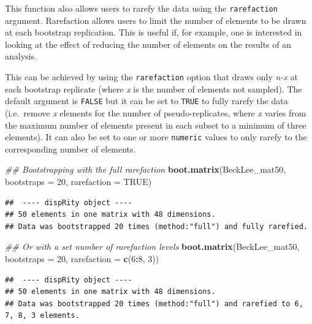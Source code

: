 \documentclass[]{book}
\newenvironment{Shaded}{\begin{snugshade}}{\end{snugshade}}
\newcommand{\CommentTok}[1]{\textcolor[rgb]{0.56,0.35,0.01}{\textit{#1}}}
\newcommand{\DataTypeTok}[1]{\textcolor[rgb]{0.13,0.29,0.53}{#1}}
\newcommand{\DecValTok}[1]{\textcolor[rgb]{0.00,0.00,0.81}{#1}}
\newcommand{\KeywordTok}[1]{\textcolor[rgb]{0.13,0.29,0.53}{\textbf{#1}}}
\newcommand{\NormalTok}[1]{#1}
\newcommand{\OperatorTok}[1]{\textcolor[rgb]{0.81,0.36,0.00}{\textbf{#1}}}
\newcommand{\OtherTok}[1]{\textcolor[rgb]{0.56,0.35,0.01}{#1}}
\begin{document}
This function also allows users to rarefy the data using the \texttt{rarefaction} argument.
Rarefaction allows users to limit the number of elements to be drawn at each bootstrap replication.
This is useful if, for example, one is interested in looking at the effect of reducing the number of elements on the results of an analysis.

This can be achieved by using the \texttt{rarefaction} option that draws only \emph{n-x} at each bootstrap replicate (where \emph{x} is the number of elements not sampled).
The default argument is \texttt{FALSE} but it can be set to \texttt{TRUE} to fully rarefy the data (i.e.~remove \emph{x} elements for the number of pseudo-replicates, where \emph{x} varies from the maximum number of elements present in each subset to a minimum of three elements).
It can also be set to one or more \texttt{numeric} values to only rarefy to the corresponding number of elements.

\begin{Shaded}
\begin{Highlighting}[]
\CommentTok{## Bootstrapping with the full rarefaction}
\KeywordTok{boot.matrix}\NormalTok{(BeckLee_mat50, }\DataTypeTok{bootstraps =} \DecValTok{20}\NormalTok{,}
            \DataTypeTok{rarefaction =} \OtherTok{TRUE}\NormalTok{)}
\end{Highlighting}
\end{Shaded}

\begin{verbatim}
##  ---- dispRity object ---- 
## 50 elements in one matrix with 48 dimensions.
## Data was bootstrapped 20 times (method:"full") and fully rarefied.
\end{verbatim}

\begin{Shaded}
\begin{Highlighting}[]
\CommentTok{## Or with a set number of rarefaction levels}
\KeywordTok{boot.matrix}\NormalTok{(BeckLee_mat50, }\DataTypeTok{bootstraps =} \DecValTok{20}\NormalTok{,}
            \DataTypeTok{rarefaction =} \KeywordTok{c}\NormalTok{(}\DecValTok{6}\OperatorTok{:}\DecValTok{8}\NormalTok{, }\DecValTok{3}\NormalTok{))}
\end{Highlighting}
\end{Shaded}

\begin{verbatim}
##  ---- dispRity object ---- 
## 50 elements in one matrix with 48 dimensions.
## Data was bootstrapped 20 times (method:"full") and rarefied to 6, 7, 8, 3 elements.
\end{verbatim}
\end{document}
